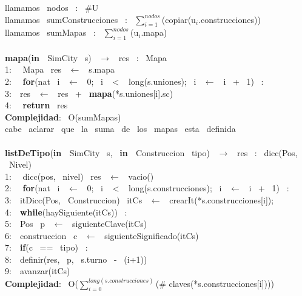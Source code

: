 \begin{Algoritmos}
llamamos \ nodos \ : \ $ \# $U\\
llamamos \ sumConstrucciones \ : \ $\sum_{i=1}^{nodos}$(copiar(u$_i$.construcciones))\\
llamamos \ sumMapas \ : \ $\sum_{i=1}^{nodos}$(u$_i$.mapa)\\
\\
\makebox[\linewidth]{\rule{\textwidth}{0.4pt}}
\textbf{mapa}(\textbf{in \ }SimCity \ s) \ $\rightarrow $ \ res \ : \ Mapa \ \\
1: \  \ Mapa \ res \ $\leftarrow$ \ s.mapa\\
2: \  \ \textbf{for}(nat \ i \ $\leftarrow$ \ 0; \ i \ $<$ \ long(s.uniones); \ i \ $\leftarrow$ \ i \ + \ 1) \ : \ \\
3:\indent  \  \ res \ $\leftarrow$ \ res \ + \ \textbf{mapa}(*s.uniones[i].sc)\\
4: \  \ \textbf{return} \ res\\
\textbf{Complejidad}: \ O(sumMapas) \ \\
cabe \ aclarar \ que \ la \ suma \ de \ los \ mapas \ esta \ definida\\
\makebox[\linewidth]{\rule{\textwidth}{0.4pt}}
\\
\makebox[\linewidth]{\rule{\textwidth}{0.4pt}}
\textbf{listDeTipo}(\textbf{in \ }SimCity \ s, \ \textbf{in \ }Construccion \ tipo) \ $\rightarrow $ \ res \ : \ dicc(Pos, \ Nivel)\\
1: \  \ dicc(pos, \ nivel) \ res \ $\leftarrow$ \ vacio()\\
2: \  \ \textbf{for}(nat \ i \ $\leftarrow$ \ 0; \ i \ $<$ \ long(s.construcciones); \ i \ $\leftarrow$ \ i \ + \ 1) \ : \ \\
3:\indent  \  \ itDicc(Pos, \ Construccion) \ itCs \ $\leftarrow$ \ crearIt(*s.construcciones[i]);\\
4:\indent  \  \ \textbf{while}(haySiguiente(itCs)) \ :\\
5:\indent \indent  \  \ Pos \ p \ $\leftarrow$ \ siguienteClave(itCs)\\
6:\indent \indent  \  \ construccion \ c \ $\leftarrow$ \ siguienteSignificado(itCs)\\
7:\indent \indent  \  \ \textbf{if}(c \ == \ tipo) \ :\\
8:\indent \indent \indent  \  \ definir(res, \ p, \ s.turno \ - \ (i+1))\\
9:\indent \indent  \  \ avanzar(itCs) \ \\
\textbf{Complejidad}: \ O($\sum_{i = 0}^{long(s.construcciones)}$(\# claves(*s.construcciones[i])))\\

\end{Algoritmos}
